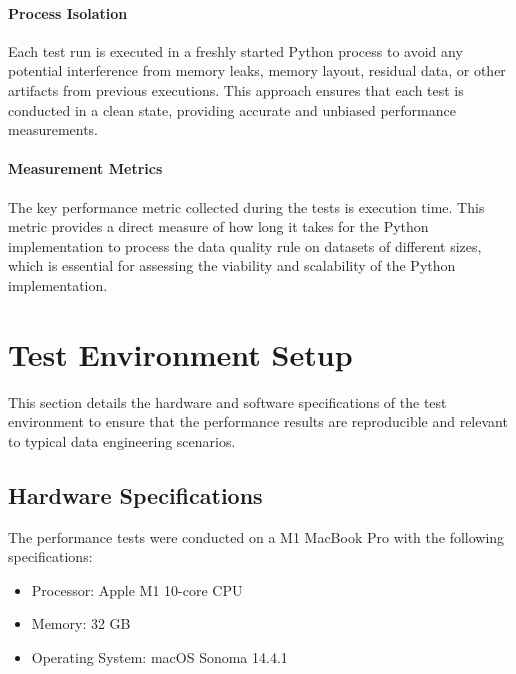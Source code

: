 \paragraph{Process Isolation} Each test run is executed in a freshly started Python process to avoid any potential interference from memory leaks, memory layout, residual data, or other artifacts from previous executions. This approach ensures that each test is conducted in a clean state, providing accurate and unbiased performance measurements.

\paragraph{Measurement Metrics} The key performance metric collected during the tests is execution time. This metric provides a direct measure of how long it takes for the Python implementation to process the data quality rule on datasets of different sizes, which is essential for assessing the viability and scalability of the Python implementation.


\section{Test Environment Setup}


This section details the hardware and software specifications of the test environment to ensure that the performance results are reproducible and relevant to typical data engineering scenarios.

\subsection{Hardware Specifications}

    The performance tests were conducted on a M1 MacBook Pro with the following specifications:

    \begin{itemize}
        \item Processor: Apple M1 10-core CPU
        \item Memory: 32 GB
        \item Operating System: macOS Sonoma 14.4.1
    \end{itemize}

